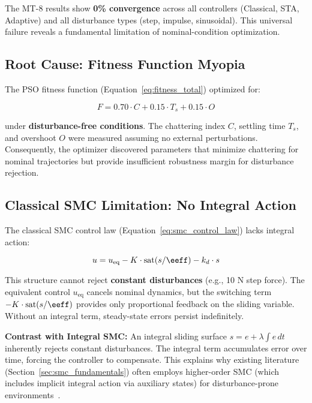 The MT-8 results show \textbf{0\% convergence} across all controllers (Classical, STA, Adaptive) and all disturbance types (step, impulse, sinusoidal). This universal failure reveals a fundamental limitation of nominal-condition optimization.

\subsection{Root Cause: Fitness Function Myopia}
\label{subsec:fitness_myopia}

The PSO fitness function (Equation~\ref{eq:fitness_total}) optimized for:

\begin{equation}
\label{eq:nominal_fitness}
F = 0.70 \cdot C + 0.15 \cdot T_s + 0.15 \cdot O
\end{equation}

under \textbf{disturbance-free conditions}. The chattering index $C$, settling time $T_s$, and overshoot $O$ were measured assuming no external perturbations. Consequently, the optimizer discovered parameters that minimize chattering for nominal trajectories but provide insufficient robustness margin for disturbance rejection.

\subsection{Classical SMC Limitation: No Integral Action}
\label{subsec:integral_action}

The classical SMC control law (Equation~\ref{eq:smc_control_law}) lacks integral action:

\begin{equation}
u = u_{\text{eq}} - K \cdot \text{sat}(s/\eeff) - k_d \cdot s
\end{equation}

This structure cannot reject \textbf{constant disturbances} (e.g., 10 N step force). The equivalent control $u_{\text{eq}}$ cancels nominal dynamics, but the switching term $-K \cdot \text{sat}(s/\eeff)$ provides only proportional feedback on the sliding variable. Without an integral term, steady-state errors persist indefinitely.

\textbf{Contrast with Integral SMC:}
An integral sliding surface $s = e + \lambda \int e \, dt$ inherently rejects constant disturbances. The integral term accumulates error over time, forcing the controller to compensate. This explains why existing literature (Section~\ref{sec:smc_fundamentals}) often employs higher-order SMC (which includes implicit integral action via auxiliary states) for disturbance-prone environments~\cite{levant2007principles}.

